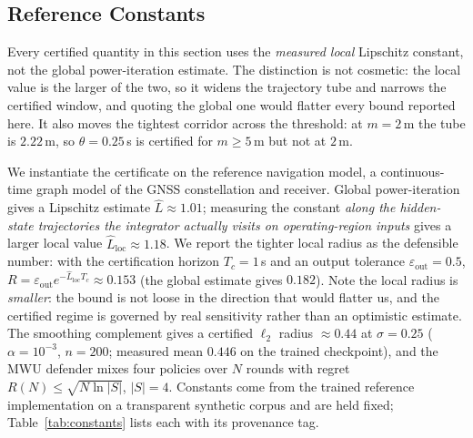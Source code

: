 \subsection{Reference Constants}
Every certified quantity in this section uses the \emph{measured local}
Lipschitz constant, not the global power-iteration estimate. The distinction
is not cosmetic: the local value is the larger of the two, so it widens the
trajectory tube and narrows the certified window, and quoting the global one
would flatter every bound reported here. It also moves the tightest corridor
across the threshold: at $m{=}2$\,m the tube is $2.22$\,m, so
$\theta{=}0.25$\,s is certified for $m\ge5$\,m but not at $2$\,m.

We instantiate the certificate on the reference navigation model, a
continuous-time graph model of the GNSS constellation and receiver. Global
power-iteration gives a Lipschitz estimate $\hat L\approx1.01$; measuring the
constant \emph{along the hidden-state trajectories the integrator actually
visits on operating-region inputs} gives a larger local value
$\hat L_{\mathrm{loc}}\approx1.18$. We report the tighter local radius as the
defensible number: with the certification horizon $T_c=1$\,s and an output
tolerance $\varepsilon_{\mathrm{out}}=0.5$,
$R=\varepsilon_{\mathrm{out}}e^{-\hat L_{\mathrm{loc}}T_c}\approx0.153$ (the
global estimate gives $0.182$). Note the local radius is \emph{smaller}: the
bound is not loose in the direction that would flatter us, and the certified
regime is governed by real sensitivity rather than an optimistic estimate. The
smoothing complement gives a certified $\ell_2$ radius $\approx0.44$ at
$\sigma=0.25$ ($\alpha=10^{-3}$, $n=200$; measured mean $0.446$ on the trained
checkpoint), and the MWU defender mixes four policies over $N$ rounds with regret
$R(N)\le\sqrt{N\ln|S|}$, $|S|=4$. Constants come from the trained reference
implementation on a transparent synthetic corpus and are held fixed;
Table~\ref{tab:constants} lists each with its provenance tag.

\begin{table}[t]
\centering
\caption{Instantiated constants and their provenance. The one pending numeric
constant is the PAC--Bayes prior/posterior KL, which we flag rather than
substitute.}
\label{tab:constants}
\small
\renewcommand{\arraystretch}{1.05}

\end{table}

